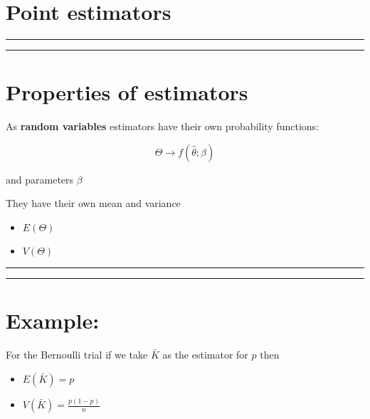 \documentclass[
]{book}
\providecommand{\tightlist}{%
  \setlength{\itemsep}{0pt}\setlength{\parskip}{0pt}}
\begin{document}
\hypertarget{point-estimators-3}{%
\section{Point estimators}\label{point-estimators-3}}

\begin{center}\rule{0.5\linewidth}{0.5pt}\end{center}

\begin{center}\rule{0.5\linewidth}{0.5pt}\end{center}

\hypertarget{properties-of-estimators}{%
\section{Properties of estimators}\label{properties-of-estimators}}

As \textbf{random variables} estimators have their own probability functions:

\[\Theta \rightarrow f(\hat{\theta}; \beta)\]

and parameters \(\beta\)

They have their own mean and variance

\begin{itemize}
\tightlist
\item
  \(E(\Theta)\)\\
\item
  \(V(\Theta)\)
\end{itemize}

\begin{center}\rule{0.5\linewidth}{0.5pt}\end{center}

\begin{center}\rule{0.5\linewidth}{0.5pt}\end{center}

\hypertarget{example-12}{%
\section{Example:}\label{example-12}}

For the Bernoulli trial if we take \(\bar{K}\) as the estimator for \(p\) then

\begin{itemize}
\tightlist
\item
  \(E(\bar{K})=p\)
\item
  \(V(\bar{K})=\frac{p(1-p)}{n}\)
\end{itemize}
\end{document}
